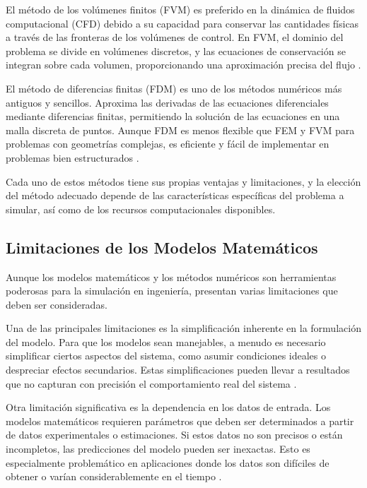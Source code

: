 El método de los volúmenes finitos (FVM) es preferido en la dinámica de fluidos computacional (CFD) debido a su capacidad para conservar las cantidades físicas a través de las fronteras de los volúmenes de control. En FVM, el dominio del problema se divide en volúmenes discretos, y las ecuaciones de conservación se integran sobre cada volumen, proporcionando una aproximación precisa del flujo \cite{ferziger2012computational}.

El método de diferencias finitas (FDM) es uno de los métodos numéricos más antiguos y sencillos. Aproxima las derivadas de las ecuaciones diferenciales mediante diferencias finitas, permitiendo la solución de las ecuaciones en una malla discreta de puntos. Aunque FDM es menos flexible que FEM y FVM para problemas con geometrías complejas, es eficiente y fácil de implementar en problemas bien estructurados \cite{timoshenko1983history}.

Cada uno de estos métodos tiene sus propias ventajas y limitaciones, y la elección del método adecuado depende de las características específicas del problema a simular, así como de los recursos computacionales disponibles.

\subsection{Limitaciones de los Modelos Matemáticos}

Aunque los modelos matemáticos y los métodos numéricos son herramientas poderosas para la simulación en ingeniería, presentan varias limitaciones que deben ser consideradas.

Una de las principales limitaciones es la simplificación inherente en la formulación del modelo. Para que los modelos sean manejables, a menudo es necesario simplificar ciertos aspectos del sistema, como asumir condiciones ideales o despreciar efectos secundarios. Estas simplificaciones pueden llevar a resultados que no capturan con precisión el comportamiento real del sistema \cite{karniadakis2021physics}.

Otra limitación significativa es la dependencia en los datos de entrada. Los modelos matemáticos requieren parámetros que deben ser determinados a partir de datos experimentales o estimaciones. Si estos datos no son precisos o están incompletos, las predicciones del modelo pueden ser inexactas. Esto es especialmente problemático en aplicaciones donde los datos son difíciles de obtener o varían considerablemente en el tiempo \cite{oberkampf2010verification}.

